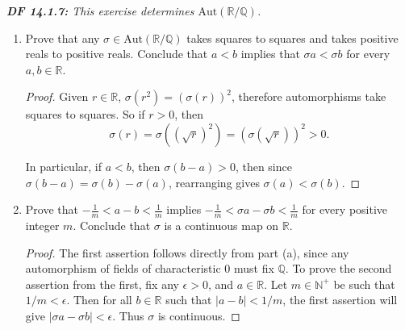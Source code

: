 \documentclass{article}
\begin{document}
\it \textbf{DF 14.1.7:} This exercise determines
  $\text{Aut}(\mathbb{R}/\mathbb{Q})$.

  \begin{enumerate}[label={(\alph*)}]
    \item Prove that any $\sigma\in\text{Aut}(\mathbb{R}/\mathbb{Q})$ takes
      squares to squares and takes positive reals to positive reals.
      Conclude that $a<b$ implies that $\sigma a<\sigma b$ for every
      $a,b\in\mathbb{R}$.

      \begin{proof}
        Given $r\in\mathbb{R}$, $\sigma(r^2)=(\sigma(r))^2$, therefore
        automorphisms take squares to squares. So if $r>0$, then
        \[\sigma(r)=\sigma((\sqrt{r})^2)=(\sigma(\sqrt{r}))^2>0.\]

        In particular, if $a<b$, then $\sigma(b-a)>0$, then since
        $\sigma(b-a)=\sigma(b)-\sigma(a)$, rearranging gives
        $\sigma(a)<\sigma(b)$.
      \end{proof}

    \item Prove that $-\frac{1}{m}<a-b<\frac{1}{m}$ implies
      $-\frac{1}{m}<\sigma a-\sigma b<\frac{1}{m}$ for every
      positive integer $m$. Conclude that $\sigma$ is a continuous map on
      $\mathbb{R}$.

      \begin{proof}
        The first assertion follows directly from part (a), since any
        automorphism of fields of characteristic 0 must fix $\mathbb{Q}$.
        To prove the second assertion from the first, fix any $\epsilon>0$,
        and $a\in\mathbb{R}$. Let $m\in\mathbb{N}^+$ be such that
        $1/m<\epsilon$. Then for all $b\in\mathbb{R}$ such that
        $|a-b|<1/m$, the first assertion will give $|\sigma a-\sigma
        b|<\epsilon$. Thus $\sigma$ is continuous.
      \end{proof}
  \end{enumerate}
\end{document}
